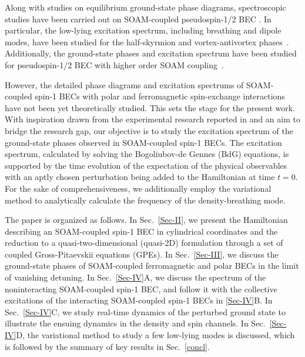 \documentclass[pra,twocolumn,aps,superscriptaddress,showpacs,longbibliography]{revtex4-1}
\begin{document}
Along with studies on equilibrium ground-state phase diagrams, spectroscopic studies have been carried out on SOAM-coupled pseudospin-1/2 BEC 
\cite{chen2020angular,vasic2016excitation,chen2020ground}. In particular, the low-lying excitation spectrum, including breathing and 
dipole modes, have been studied for the half-skyrmion and vortex-antivortex phases~\cite{vasic2016excitation,chen2020angular}.
Additionally, the ground-state phases and excitation spectrum have been studied for 
pseudospin-1/2 BEC with higher order SOAM coupling~\cite{chen2020ground}. 

However, the detailed phase diagrams and excitation spectrums of SOAM-coupled spin-1 BECs with polar and ferromagnetic
spin-exchange interactions have not been yet theoretically studied. This sets the stage for the present work.
With inspiration drawn from the experimental research reported in \cite{chen2018rotating} and an aim to bridge 
the research gap, our objective is to study the excitation spectrum of the ground-state phases observed in 
SOAM-coupled spin-1 BECs.
The excitation spectrum, calculated by solving the Bogoliubov-de Gennes (BdG) equations, is supported by the time evolution
of the expectation of the physical observables with an aptly chosen perturbation being added to the Hamiltonian at time $t = 0$.
For the sake of comprehensiveness, we additionally employ the variational method to analytically 
calculate the frequency of the density-breathing mode.

The paper is organized as follows. In Sec.~\ref{Sec-II}, we present the Hamiltonian 
describing an SOAM-coupled spin-1 BEC in cylindrical coordinates and the reduction 
to a quasi-two-dimensional (quasi-2D) formulation through a set of coupled Gross-Pitaevskii equations (GPEs). In Sec.~\ref{Sec-III},
we discuss the ground-state phases of SOAM-coupled ferromagnetic and polar BECs in the limit
of vanishing detuning. In Sec.~\ref{Sec-IV}A, we discuss the spectrum of the noninteracting 
SOAM-coupled spin-1 BEC, and follow it with the collective excitations of the interacting SOAM-coupled 
spin-1 BECs in \ref{Sec-IV}B.
In Sec.~\ref{Sec-IV}C, we study real-time dynamics of the perturbed 
ground state to illustrate the ensuing dynamics in the density and spin channels. In 
Sec.~\ref{Sec-IV}D, the variational method to study a few low-lying modes is discussed, which
is followed by the summary of key results in Sec.~\ref{concl}.

\end{document}
